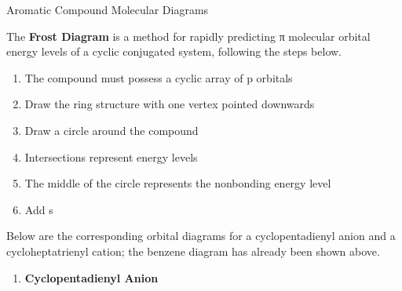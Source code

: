     \begin{core}{Aromatic Compound Molecular Diagrams}

      The \textbf{Frost Diagram} is a method for rapidly predicting π molecular orbital energy levels of a cyclic conjugated system, following the steps below.

      \begin{enumerate}[label=(\arabic*)]

        \item The compound must possess a cyclic array of p orbitals

        \item Draw the ring structure with one vertex pointed downwards

        \item Draw a circle around the compound

        \item Intersections represent energy levels

        \item The middle of the circle represents the nonbonding energy level

        \item Add s

      \end{enumerate}

      Below are the corresponding orbital diagrams for a cyclopentadienyl anion and a cycloheptatrienyl cation; the benzene diagram has already been shown above.

      \begin{enumerate}

        \item \textbf{Cyclopentadienyl Anion}

\end{enumerate}
\end{core}
